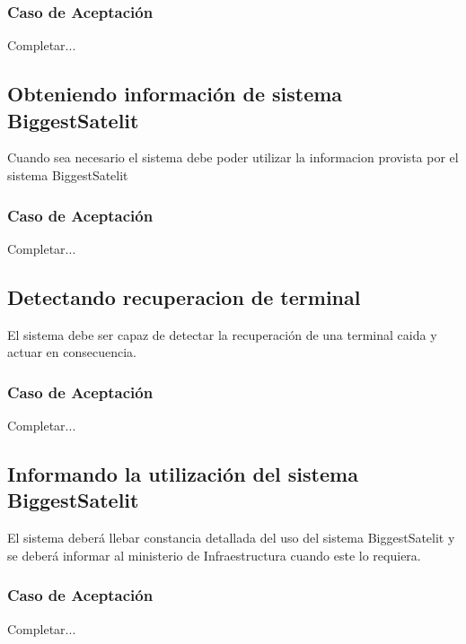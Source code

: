 \subsubsection*{Caso de Aceptación}
Completar...

\linea \subsection*{Obteniendo información de sistema BiggestSatelit}
Cuando sea necesario el sistema debe poder utilizar la informacion provista por el sistema BiggestSatelit
\subsubsection*{Caso de Aceptación}
Completar...

\linea \subsection*{Detectando recuperacion de terminal}
El sistema debe ser capaz de detectar la recuperación de una terminal caida y actuar en consecuencia.
\subsubsection*{Caso de Aceptación}
Completar...

\linea \subsection*{Informando la utilización del sistema BiggestSatelit}
El sistema deberá llebar constancia detallada del uso del sistema BiggestSatelit y se deberá informar al ministerio de Infraestructura cuando este lo requiera.
\subsubsection*{Caso de Aceptación}
Completar...

